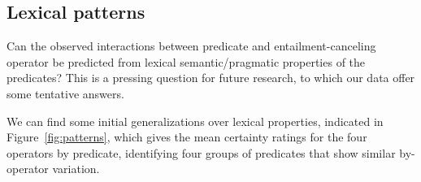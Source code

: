 \documentclass[a4paper,12pt,twoside]{article}
\begin{document}


\subsection{Lexical patterns}\label{s:lex}

Can the observed interactions between predicate and entailment-canceling operator be predicted from lexical semantic/pragmatic properties of the predicates? This is a pressing question for future research, to which our data offer some tentative answers. 

We can find some initial generalizations over lexical properties, indicated in Figure~\ref{fig:patterns}, which gives the mean certainty ratings for the four operators by predicate, identifying four groups of predicates that show similar by-operator variation.
	
\end{document}
